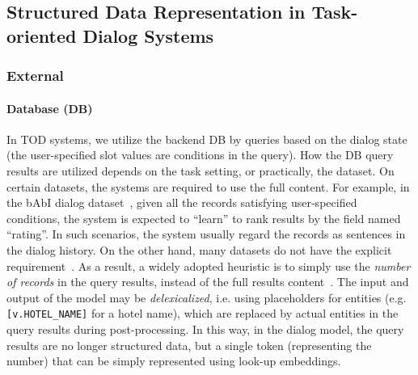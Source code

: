 \documentclass[11pt,dvipdfm]{article}
\begin{document}
\subsection{Structured Data Representation in Task-oriented Dialog Systems}


\subsubsection{External}
\paragraph{Database (DB)}
In TOD systems, we utilize the backend DB by queries based on the dialog state (the user-specified slot values are conditions in the query). How the DB query results are utilized depends on the task setting, or practically, the dataset.
On certain datasets, the systems are required to use the full content. For example, in the bAbI dialog dataset~\cite{bAbIDialog}, given all the records satisfying user-specified conditions, the system is expected to ``learn'' to rank results by the field named ``rating''. In such scenarios, the system usually regard the records as sentences in the dialog history.
On the other hand, many datasets do not have the explicit requirement~\cite{DSTC2,multiwoz,wen2017EndtoEnd}. As a result, a widely adopted heuristic is to simply use the \textit{number of records} in the query results, instead of the full results content~\cite{wen2017EndtoEnd,liu2018DialogueHumanTeaching,zhang2020LatentBeliefState}. The input and output of the model may be \textit{delexicalized}, i.e. using placeholders for entities (e.g. \texttt{[v.HOTEL\_NAME]} for a hotel name), which are replaced by actual entities in the query results during post-processing. In this way, in the dialog model, the query results are no longer structured data, but a single token (representing the number) that can be simply represented using look-up embeddings.
\end{document}
